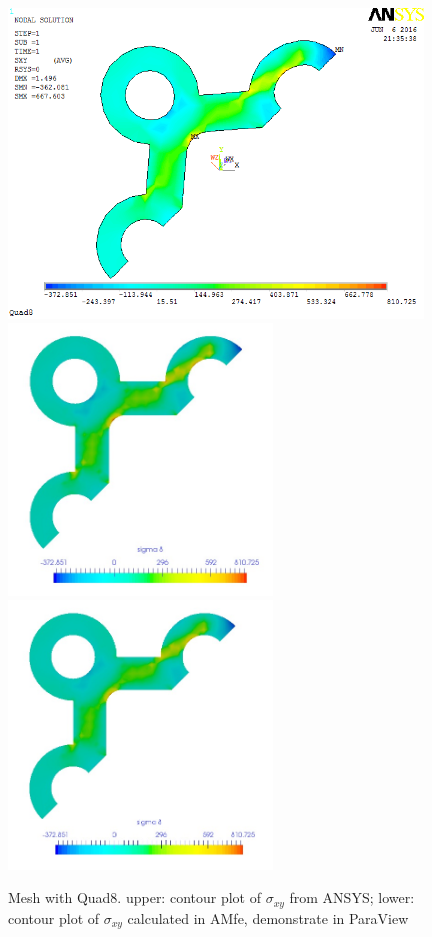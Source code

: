 \begin{figure}[htbp]
	\begin{center}
		\includegraphics[width=11cm,clip]{Quad8_Sxy.png} 
		\includegraphics[width=7cm,clip]{Quad8_Sxy_PD.png} 		
		\includegraphics[width=7cm,clip]{Quad8_Sxy_P.png} 		
		\caption{Mesh with Quad8. upper: contour plot of $\sigma_{xy}$ from ANSYS; lower: contour plot of $\sigma_{xy}$ calculated in AMfe, demonstrate in ParaView} \label{fig: Quad8_Sxy}
	\end{center}
\end{figure}
\clearpage 

